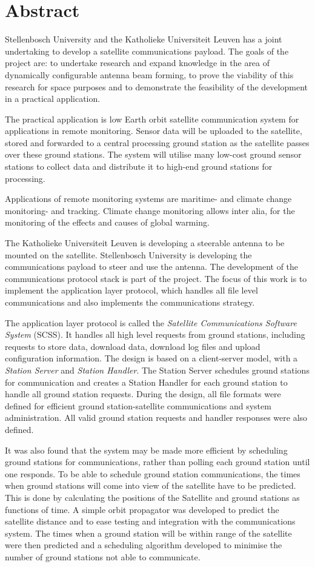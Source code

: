 
\chapter*{Abstract}
Stellenbosch University and the Katholieke Universiteit Leuven has a joint undertaking to develop
a satellite communications payload. The goals of the project are: to undertake research
and expand knowledge in the area of dynamically configurable antenna beam forming, to prove
the viability of this research for space purposes and to demonstrate the feasibility of the
development in a practical application.

The practical application is low Earth orbit satellite communication system for applications in remote monitoring.
Sensor data will be uploaded to the satellite, stored and forwarded to a central processing
ground station as the satellite passes over these ground stations. The system will utilise many
low-cost ground sensor stations to collect data and distribute it to high-end ground stations
for processing.

Applications of remote monitoring systems are maritime- and climate change monitoring-
and tracking. Climate change monitoring allows inter alia, for the monitoring of the effects and causes
of global warming.

The Katholieke Universiteit Leuven is developing a steerable antenna to be mounted on the
satellite. Stellenbosch University is developing the communications payload to steer and use
the antenna. The development of the communications protocol stack is part of the project.
The focus of this work is to implement the application layer protocol, which handles all file level
communications and also implements the communications strategy.

The application layer protocol is called the \emph{Satellite Communications Software System}
(SCSS). It handles all high level requests from ground stations, including requests to store
data, download data, download log files and upload configuration information. The design
is based on a client-server model, with a \emph{Station Server} and \emph{Station Handler}.
The Station Server schedules ground stations for communication and creates a Station Handler
for each ground station to handle all ground station requests. During the design, all file
formats were defined for efficient ground station-satellite communications and system administration.
All valid ground station requests and handler responses were also defined.

It was also found that the system may be made more efficient by scheduling ground stations
for communications, rather than polling each ground station until one responds. To be able
to schedule ground station communications, the times when ground stations will come into
view of the satellite have to be predicted. This is done by calculating the positions of the
Satellite and ground stations as functions of time. A simple orbit propagator was developed to
predict the satellite distance and to ease testing and integration with the communications system.
The times when a ground station will be within range of the satellite were then predicted and
a scheduling algorithm developed to minimise the number of ground stations not
able to communicate.

